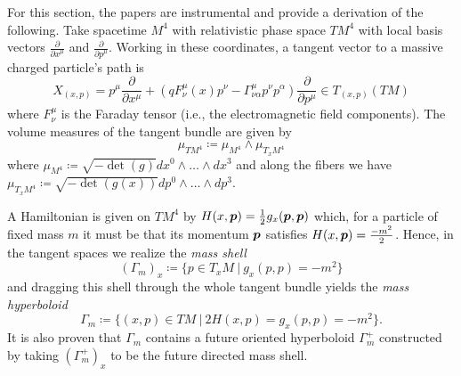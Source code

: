 \documentclass{article}
\begin{document}
For this section, the papers \cite{sarbach_geometry_2014,sarbach_relativistic_2013,sarbach_tangent_2014} are instrumental and provide a derivation of the following. Take spacetime $M^4$ with relativistic phase space $TM^4$ with local basis vectors $\frac{\partial}{\partial x^\mu}$ and $\frac{\partial}{\partial p^\mu}$. Working in these coordinates, a tangent vector to a massive charged particle's path is
\begin{equation}
    X_{(x,p)} = p^\mu \frac{\partial}{\partial x^\mu} + (q F^\mu_\nu(x) p^\nu - \Gamma^\mu_{\nu\alpha} p^\nu p^\alpha) \frac{\partial}{\partial p^\mu} \in T_{(x,p)} (TM)
\end{equation}
where $F^\mu_\nu$ is the Faraday tensor (i.e., the electromagnetic field components). The volume measures of the tangent bundle are given by
\begin{equation}
    \mu_{TM^4} \coloneqq \mu_{M^4}\wedge \mu_{T_xM^4}
\end{equation}
where $\mu_{M^4} \coloneqq \sqrt{-\det(g)} dx^0\wedge \dots \wedge dx^3$ and along the fibers we have $\mu_{T_xM^4} \coloneqq \sqrt{-\det(g(x))} dp^0\wedge\dots\wedge dp^3$. 

A Hamiltonian is given on $TM^4$ by $H(x,\boldsymbol{p}) = \frac{1}{2}g_x(\boldsymbol{p},\boldsymbol{p})$ which, for a particle of fixed mass $m$ it must be that its momentum $\boldsymbol{p}$ satisfies $H(x,\boldsymbol{p})=\frac{-m^2}{2}$. Hence, in the tangent spaces we realize the \emph{mass shell} 
\begin{equation}
(\Gamma_{m})_x \coloneqq \{p\in T_xM ~\vert~ g_x(p,p) = -m^2\}
\end{equation}
and dragging this shell through the whole tangent bundle yields the \emph{mass hyperboloid}
\begin{equation}
    \Gamma_m \coloneqq \{ (x,p) \in TM ~\vert~ 2H(x,p) = g_x(p,p)=-m^2 \}.
\end{equation}
It is also proven that $\Gamma_m$ contains a future oriented hyperboloid $\Gamma_m^+$ constructed by taking $(\Gamma^+_m)_x$ to be the future directed mass shell.
\end{document}
